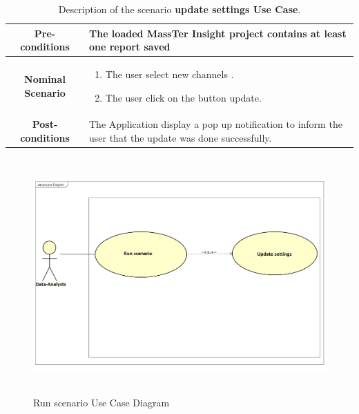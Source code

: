     \begin{table}
    	\caption{Description of the scenario \textbf{update settings Use Case}.}
    	\label{DSTabUS}
  	\centering
  	\begin{tabular}{|c|p{10cm}|}
  	
  		\hline 	
  		\textbf{Pre-conditions } &The loaded MassTer Insight project contains at least one report saved \\ 
  		\hline                     
  		\textbf{Nominal Scenario } & \begin{enumerate}
  			\item The user select new channels .
  			\item The user click on the button update.  
  		\end{enumerate} \\ 
  		\hline 
  		\textbf{Post-conditions} & The Application display a pop up notification to inform the user that the update was done successfully. \\
  		\hline 
  	\end{tabular}
  \end{table}

	 	\begin{figure}[!t]
	 	\centering
	 	\includegraphics[width=14cm,height=9cm]{runScenario.png}
	 	\caption{Run scenario Use Case Diagram}
	 	
	 \end{figure}
	

	\clearpage
	\newpage
	
